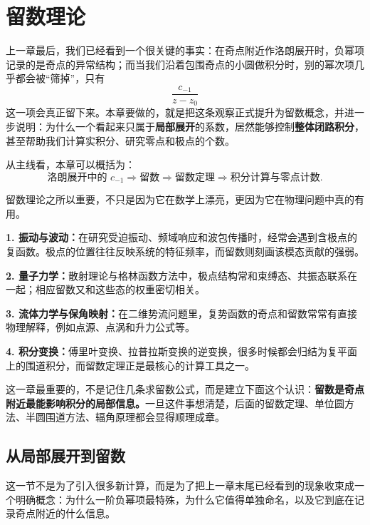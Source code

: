
\chapter{留数理论}

\begin{wulibj}[本章导读]
上一章最后，我们已经看到一个很关键的事实：在奇点附近作洛朗展开时，负幂项记录的是奇点的异常结构；而当我们沿着包围奇点的小圆做积分时，别的幂次项几乎都会被``筛掉''，只有
\[
    \frac{c_{-1}}{z-z_0}
\]
这一项会真正留下来。本章要做的，就是把这条观察正式提升为留数概念，并进一步说明：为什么一个看起来只属于\textbf{局部展开}的系数，居然能够控制\textbf{整体闭路积分}，甚至帮助我们计算实积分、研究零点和极点的个数。

从主线看，本章可以概括为：
\[
    \text{洛朗展开中的 } c_{-1}
    \Longrightarrow
    \text{留数}
    \Longrightarrow
    \text{留数定理}
    \Longrightarrow
    \text{积分计算与零点计数}.
\]
\end{wulibj}

\begin{wulibj}[物理背景]
留数理论之所以重要，不只是因为它在数学上漂亮，更因为它在物理问题中真的有用。

\textbf{1. 振动与波动：}在研究受迫振动、频域响应和波包传播时，经常会遇到含极点的复函数。极点的位置往往反映系统的特征频率，而留数则刻画该模态贡献的强弱。

\textbf{2. 量子力学：}散射理论与格林函数方法中，极点结构常和束缚态、共振态联系在一起；相应留数又和这些态的权重密切相关。

\textbf{3. 流体力学与保角映射：}在二维势流问题里，复势函数的奇点和留数常常有直接物理解释，例如点源、点涡和升力公式等。

\textbf{4. 积分变换：}傅里叶变换、拉普拉斯变换的逆变换，很多时候都会归结为复平面上的围道积分，而留数定理正是最核心的计算工具之一。
\end{wulibj}

\begin{tishi}[先把本章主线抓住]
这一章最重要的，不是记住几条求留数公式，而是建立下面这个认识：\textbf{留数是奇点附近最能影响积分的局部信息。}一旦这件事想清楚，后面的留数定理、单位圆方法、半圆围道方法、辐角原理都会显得顺理成章。
\end{tishi}

\section{从局部展开到留数}

\begin{wulibj}[本节的任务]
这一节不是为了引入很多新计算，而是为了把上一章末尾已经看到的现象收束成一个明确概念：为什么一阶负幂项最特殊，为什么它值得单独命名，以及它到底在记录奇点附近的什么信息。
\end{wulibj}

